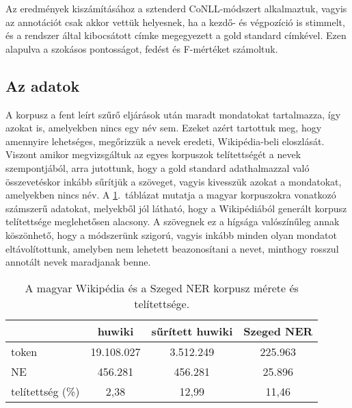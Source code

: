\documentclass{llncs}
\begin{document}
Az eredmények kiszámításához a sztenderd CoNLL-módszert alkalmaztuk, vagyis az annotációt csak akkor vettük helyesnek, ha a kezdő- és végpozíció is stimmelt, és a rendszer által kibocsátott címke megegyezett a gold standard címkével. Ezen alapulva a szokásos pontosságot, fedést és F-mértéket számoltuk. 

\subsection{Az adatok}

A korpusz a fent leírt szűrő eljárások után maradt mondatokat tartalmazza, így azokat is, amelyekben nincs egy név sem. Ezeket azért tartottuk meg, hogy amennyire lehetséges, megőrizzük a nevek eredeti, Wikipédia-beli eloszlását. Viszont amikor megvizsgáltuk az egyes korpuszok telítettségét a nevek szempontjából, arra jutottunk, hogy a gold standard adathalmazzal való összevetéskor inkább sűrítjük a szöveget, vagyis kivesszük azokat a mondatokat, amelyekben nincs név. A \ref{tab:size_hu}.~táblázat mutatja a magyar korpuszokra vonatkozó számszerű adatokat, melyekből jól látható, hogy a Wikipédiából generált korpusz telítettsége meglehetősen alacsony. 
A szövegnek ez a hígsága valószínűleg annak köszönhető, hogy a módszerünk szigorú, vagyis inkább minden olyan mondatot eltávolítottunk, amelyben nem lehetett beazonosítani a nevet, minthogy rosszul annotált nevek maradjanak benne. 

 
\begin{table}[ht]
\begin{center}
\begin{tabular}{lccc}
\toprule
 & \textbf{huwiki} & \textbf{sűrített huwiki} & \textbf{Szeged NER} \\
\midrule
token & 19.108.027 & 3.512.249  & 225.963 \\
NE & 456.281 & 456.281  & 25.896 \\
telítettség (\%) & 2,38 & 12,99 & 11,46 \\
\bottomrule
\end{tabular}
\end{center}
\caption{A magyar Wikipédia és a Szeged NER korpusz mérete és telítettsége.}
\label{tab:size_hu}
\end{table}
\end{document}
